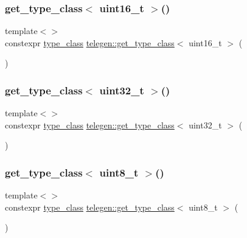 \mbox{\label{namespacetelegen_a4516777b2981979ee0fa3d6e3f995447}} 
\subsubsection{\texorpdfstring{get\+\_\+type\+\_\+class$<$ uint16\+\_\+t $>$()}{get\_type\_class< uint16\_t >()}}
{\footnotesize\ttfamily template$<$$>$ \\
constexpr \hyperlink{namespacetelegen_a72d4e69f0be1731e1a851a96dec858d8}{type\+\_\+class} \hyperlink{namespacetelegen_a6ea75c665a463a240f4a40419a810da3}{telegen\+::get\+\_\+type\+\_\+class}$<$ uint16\+\_\+t $>$ (\begin{DoxyParamCaption}{ }\end{DoxyParamCaption})}

\mbox{\label{namespacetelegen_ad713b35737b3879f29061dc6a149558a}} 
\subsubsection{\texorpdfstring{get\+\_\+type\+\_\+class$<$ uint32\+\_\+t $>$()}{get\_type\_class< uint32\_t >()}}
{\footnotesize\ttfamily template$<$$>$ \\
constexpr \hyperlink{namespacetelegen_a72d4e69f0be1731e1a851a96dec858d8}{type\+\_\+class} \hyperlink{namespacetelegen_a6ea75c665a463a240f4a40419a810da3}{telegen\+::get\+\_\+type\+\_\+class}$<$ uint32\+\_\+t $>$ (\begin{DoxyParamCaption}{ }\end{DoxyParamCaption})}

\mbox{\label{namespacetelegen_a393b0985d3f7fbe2c0d0a2ab5ce8cb4b}} 
\subsubsection{\texorpdfstring{get\+\_\+type\+\_\+class$<$ uint8\+\_\+t $>$()}{get\_type\_class< uint8\_t >()}}
{\footnotesize\ttfamily template$<$$>$ \\
constexpr \hyperlink{namespacetelegen_a72d4e69f0be1731e1a851a96dec858d8}{type\+\_\+class} \hyperlink{namespacetelegen_a6ea75c665a463a240f4a40419a810da3}{telegen\+::get\+\_\+type\+\_\+class}$<$ uint8\+\_\+t $>$ (\begin{DoxyParamCaption}{ }\end{DoxyParamCaption})}

